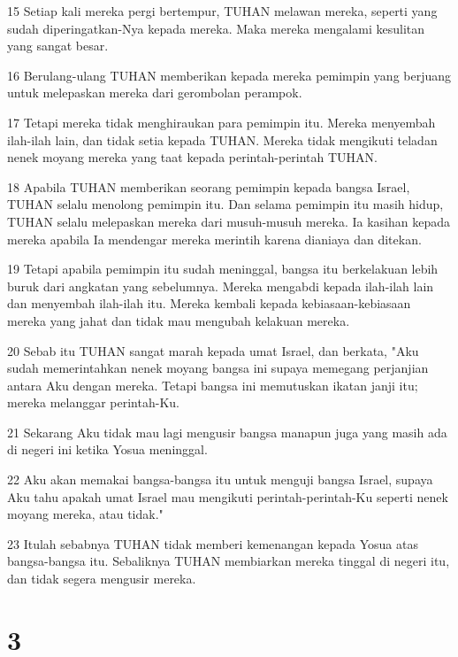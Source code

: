 \par 15 Setiap kali mereka pergi bertempur, TUHAN melawan mereka, seperti yang sudah diperingatkan-Nya kepada mereka. Maka mereka mengalami kesulitan yang sangat besar.
\par 16 Berulang-ulang TUHAN memberikan kepada mereka pemimpin yang berjuang untuk melepaskan mereka dari gerombolan perampok.
\par 17 Tetapi mereka tidak menghiraukan para pemimpin itu. Mereka menyembah ilah-ilah lain, dan tidak setia kepada TUHAN. Mereka tidak mengikuti teladan nenek moyang mereka yang taat kepada perintah-perintah TUHAN.
\par 18 Apabila TUHAN memberikan seorang pemimpin kepada bangsa Israel, TUHAN selalu menolong pemimpin itu. Dan selama pemimpin itu masih hidup, TUHAN selalu melepaskan mereka dari musuh-musuh mereka. Ia kasihan kepada mereka apabila Ia mendengar mereka merintih karena dianiaya dan ditekan.
\par 19 Tetapi apabila pemimpin itu sudah meninggal, bangsa itu berkelakuan lebih buruk dari angkatan yang sebelumnya. Mereka mengabdi kepada ilah-ilah lain dan menyembah ilah-ilah itu. Mereka kembali kepada kebiasaan-kebiasaan mereka yang jahat dan tidak mau mengubah kelakuan mereka.
\par 20 Sebab itu TUHAN sangat marah kepada umat Israel, dan berkata, "Aku sudah memerintahkan nenek moyang bangsa ini supaya memegang perjanjian antara Aku dengan mereka. Tetapi bangsa ini memutuskan ikatan janji itu; mereka melanggar perintah-Ku.
\par 21 Sekarang Aku tidak mau lagi mengusir bangsa manapun juga yang masih ada di negeri ini ketika Yosua meninggal.
\par 22 Aku akan memakai bangsa-bangsa itu untuk menguji bangsa Israel, supaya Aku tahu apakah umat Israel mau mengikuti perintah-perintah-Ku seperti nenek moyang mereka, atau tidak."
\par 23 Itulah sebabnya TUHAN tidak memberi kemenangan kepada Yosua atas bangsa-bangsa itu. Sebaliknya TUHAN membiarkan mereka tinggal di negeri itu, dan tidak segera mengusir mereka.

\chapter{3}

